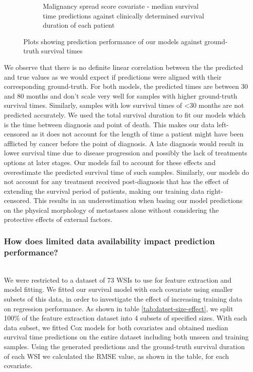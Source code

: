 \documentclass{l4proj}
\begin{document}
\begin{figure}[h]
\begin{subfigure}[b]{0.4\textwidth}
        \caption{Malignancy spread score covariate - median survival time predictions against clinically determined survival duration of each patient }
        \label{fig:mmi-predictions}
    \end{subfigure}
    \caption{Plots showing prediction performance of our models against ground-truth survival times}
    \label{fig:prediction-calibration}
\end{figure}

We observe that there is no definite linear correlation between the the predicted and true values as we would expect if predictions were aligned with their corresponding ground-truth. For both models, the predicted times are between 30 and 80 months and don't scale very well for samples with higher ground-truth survival times. Similarly, samples with low survival times of <30 months are not predicted accurately. We used the total survival duration to fit our models which is the time between diagnosis and point of death. This makes our data left-censored as it does not account for the length of time a patient might have been afflicted by cancer before the point of diagnosis. A late diagnosis would result in lower survival time due to disease progression and possibly the lack of treatments options at later stages. Our models fail to account for these effects and overestimate the predicted survival time of such samples. Similarly, our models do not account for any treatment received post-diagnosis that has the effect of extending the survival period of patients, making our training data right-censored. This results in an underestimation when basing our model predictions on the physical morphology of metastases alone without considering the protective effects of external factors. 



\subsubsection{How does limited data availability impact prediction performance?}\hfill \\
We were restricted to a dataset of 73 WSIs to use for feature extraction and model fitting. We fitted our survival model with each covariate using smaller subsets of this data, in order to investigate the effect of increasing training data on regression performance. As shown in table \ref{tab:datset-size-effect}, we split  100\% of the feature extraction dataset into 4 subsets of specified sizes. With each data subset, we fitted Cox models for both covariates and obtained median survival time predictions on the entire dataset including both unseen and training samples. Using the generated predictions and the ground-truth survival duration of each WSI we calculated the RMSE value, as shown in the table, for each covariate.
\end{document}
